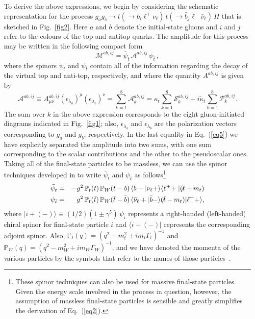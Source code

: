 \documentclass[aps,preprint,tightenlines,floatfix,superscriptaddress,nofootinbib,showpacs]{revtex4-1}
\def\beq{\begin{equation}}
\def\eeq{\end{equation}}
\def\bea{\begin{eqnarray}}
\def\eea{\end{eqnarray}}
\def\tbslash{\tbar\hspace{-10pt}\not{}\hspace{4pt}}
\def\tslash{t\hspace{-10pt}\not{}\hspace{4pt}}
\def\tbar{\bar{t}}
\def\bbar{\bar{b}}
\def\nubar{{\bar{\nu}}_{\ell}}
\def\kp{\kappa_t}
\def\kpt{\tilde{\kappa}_t}
\begin{document}
To derive the above expressions, we begin by considering the
schematic representation for the process $g_ag_b\to t(\to
b_i{\ell}^+\nu_{\ell})\,\tbar(\to \bbar_j {\ell}^- \nubar)\,H$
that is sketched in Fig.~\ref{fig2}.
Here $a$ and $b$ denote the initial-state gluons and
$i$ and $j$ refer to the colours of the top and antitop quarks.
%
The amplitude for this process may be written in the following
compact form
%
\beq
\label{eq6}
\mathcal{M}^{ab,ij}=\bar{\psi}_t\,\mathcal{A}^{ab,ij}\,\psi_{\tbar}\,,
\eeq
%
where the spinors $\bar{\psi}_t$ and $\psi_{\tbar}$
contain all of the information regarding the decay of the
virtual top and anti-top, respectively,
and where the quantity $A^{ab,ij}$ is given by
%
\beq
\label{eq5}
\mathcal{A}^{ab,ij}\equiv A^{ab,ij}_{\mu\nu}(\epsilon_{\lambda_a})^{\mu}(\epsilon_{\lambda_b})^{\nu}=\sum_{k=1}^8 \mathcal{A}^{ab,ij}_k =\kp \sum_{k=1}^8 \mathcal{S}^{ab,ij}_k + i\kpt \sum_{k=1}^8 \mathcal{P}^{ab,ij}_k.
\eeq 
%
The sum over $k$ in the above expression
corresponds to the eight gluon-initiated
diagrams indicated in Fig.~\ref{fig1}; also,
$\epsilon_{\lambda_a}$ and $\epsilon_{\lambda_b}$ are the
polarization vectors corresponding to $g_a$ and $g_b$, respectively.
In the last equality in Eq.~(\ref{eq5})
we have explicitly separated the amplitude into
two sums, with one sum corresponding to the scalar contributions
and the other to the pseudoscalar ones.
Taking all of the final-state particles to be massless, we can use the
spinor techniques
developed in \cite{Kleiss} to write $\bar{\psi}_t$ and
$\psi_{\tbar}$ as follows\footnote{These spinor techniques can also be used
  for massive final-state particles. Given the
  energy scale involved in the process in question, however, the assumption
  of massless final-state particles is sensible and greatly
  simplifies the derivation of Eq.~(\ref{eq2}).}
%
\bea
\label{eq7}
\bar{\psi}_t &=& -g^2\, \mathbb{P}_t(t)\,\mathbb{P}_W(t-b)\,
   \langle b-|\nu_{\ell}+\rangle \langle {\ell}^+\!+|(\tslash+m_t)\\
\label{eq8}
\psi_{\tbar} &=& g^2\, \mathbb{P}_t(\tbar)\,\mathbb{P}_W(\tbar-\bbar)\,
   \langle\nubar+|\bbar-\rangle (\tbslash-m_t)|{\ell}^-+\rangle,
\eea
%
where $|i+(-)\rangle \equiv (1/2)(1\pm \gamma^5)\,\psi_i$
represents a right-handed (left-handed) chiral spinor for final-state
particle $i$ and $\langle i+(-)|$ represents the corresponding adjoint spinor.
Also, $\mathbb{P}_t(q)=(q^2-m^2_t+im_t\Gamma_t)^{-1}$ and
$\mathbb{P}_W(q)=(q^2-m^2_W+im_W\Gamma_W)^{-1}$, and
we have denoted the momenta of the various particles by the symbols
that refer to the names of those particles~\cite{Mangano}.
\end{document}
